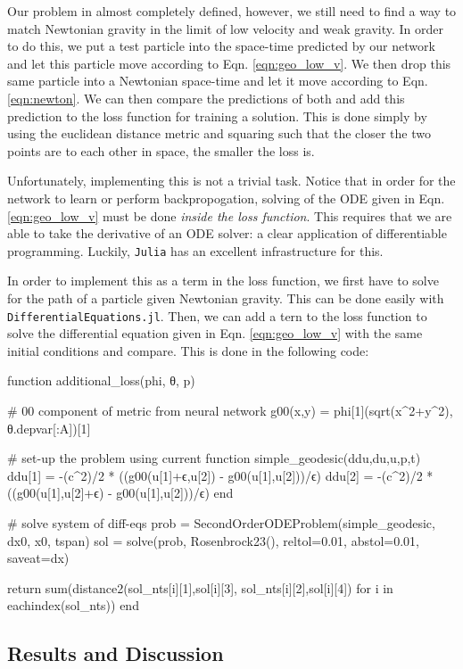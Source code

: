 \documentclass{CUP-JNL-DTM}%
\theoremstyle{definition}
\numberwithin{equation}{section}
\newcommand{\Julia}{\texttt{Julia} }
\begin{document}
Our problem in almost completely defined, however, we still need to find a way to match Newtonian gravity in the limit of low velocity and weak gravity. In order to do this, we put a test particle into the space-time predicted by our network and let this particle move according to Eqn. \ref{eqn:geo_low_v}. We then drop this same particle into a Newtonian space-time and let it move according to Eqn. \ref{eqn:newton}. We can then compare the predictions of both and add this prediction to the loss function for training a solution. This is done simply by using the euclidean distance metric and squaring such that the closer the two points are to each other in space, the smaller the loss is. 

Unfortunately, implementing this is not a trivial task. Notice that in order for the network to learn or perform backpropogation, solving of the ODE given in Eqn. \ref{eqn:geo_low_v} must be done \emph{inside the loss function}. This requires that we are able to take the derivative of an ODE solver: a clear application of differentiable programming. Luckily, \Julia has an excellent infrastructure for this. 

In order to implement this as a term in the loss function, we first have to solve for the path of a particle given Newtonian gravity. This can be done easily with \texttt{DifferentialEquations.jl}. Then, we can add a tern to the loss function to solve the differential equation given in Eqn. \ref{eqn:geo_low_v} with the same initial conditions and compare. This is done in the following code:

\begin{jllisting}
function additional_loss(phi, θ, p)

    # 00 component of metric from neural network
    g00(x,y) = phi[1](sqrt(x^2+y^2), θ.depvar[:A])[1]

    # set-up the problem using current 
    function simple_geodesic(ddu,du,u,p,t)
        ddu[1] = -(c^2)/2 * ((g00(u[1]+ϵ,u[2]) - g00(u[1],u[2]))/ϵ)
        ddu[2] = -(c^2)/2 * ((g00(u[1],u[2]+ϵ) - g00(u[1],u[2]))/ϵ)
    end

    # solve system of diff-eqs 
    prob = SecondOrderODEProblem(simple_geodesic, dx0, x0, tspan)
    sol = solve(prob, Rosenbrock23(), reltol=0.01, abstol=0.01, saveat=dx)

    return sum(distance2(sol_nts[i][1],sol[i][3],
        sol_nts[i][2],sol[i][4]) for i in eachindex(sol_nts))
end
\end{jllisting}

\subsection{Results and Discussion}
\end{document}
